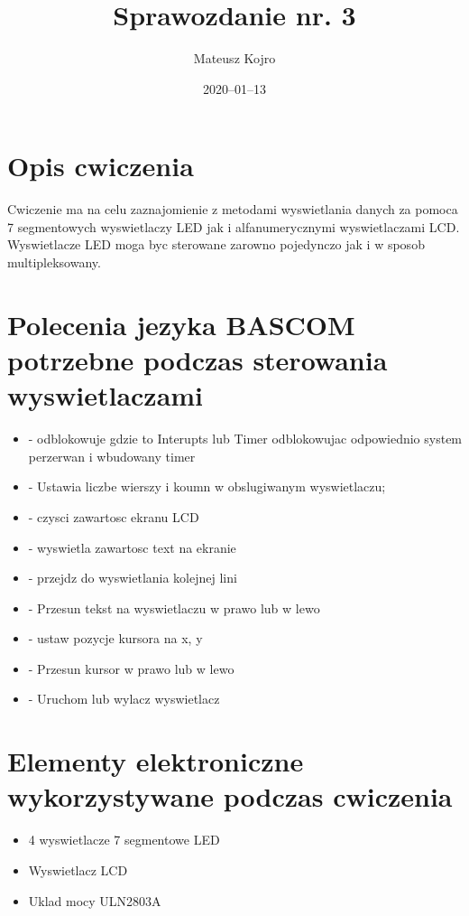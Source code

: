 \documentclass{article}
\title{Sprawozdanie nr. 3}
\author{Mateusz Kojro}
\date{2020–01–13}
\begin{document}
\maketitle

  \section{Opis cwiczenia}
  Cwiczenie ma na celu zaznajomienie z metodami wyswietlania danych za pomoca 7 segmentowych wyswietlaczy LED
  jak i alfanumerycznymi wyswietlaczami LCD.
  Wyswietlacze LED moga byc sterowane zarowno pojedynczo jak i w sposob multipleksowany.

  \section{Polecenia jezyka BASCOM potrzebne podczas sterowania wyswietlaczami}
    \begin{itemize}
      \item {} - odblokowuje  gdzie  to Interupts lub Timer
        odblokowujac odpowiednio system perzerwan i wbudowany timer
      \item {} - Ustawia liczbe wierszy i koumn w obslugiwanym wyswietlaczu;
      \item {} - czysci zawartosc ekranu LCD
      \item {} - wyswietla zawartosc text na ekranie
      \item {} - przejdz do wyswietlania kolejnej lini
      \item {} - Przesun tekst na wyswietlaczu w prawo lub w lewo
      \item {} - ustaw pozycje kursora na x, y
      \item {} - Przesun kursor w prawo lub w lewo
      \item {} - Uruchom lub wylacz wyswietlacz
    \end{itemize}
  \section{Elementy elektroniczne wykorzystywane podczas cwiczenia}

  \begin{itemize}
    \item 4 wyswietlacze 7 segmentowe LED
    \item Wyswietlacz LCD
    \item Uklad mocy ULN2803A
  \end{itemize}
\end{document}
